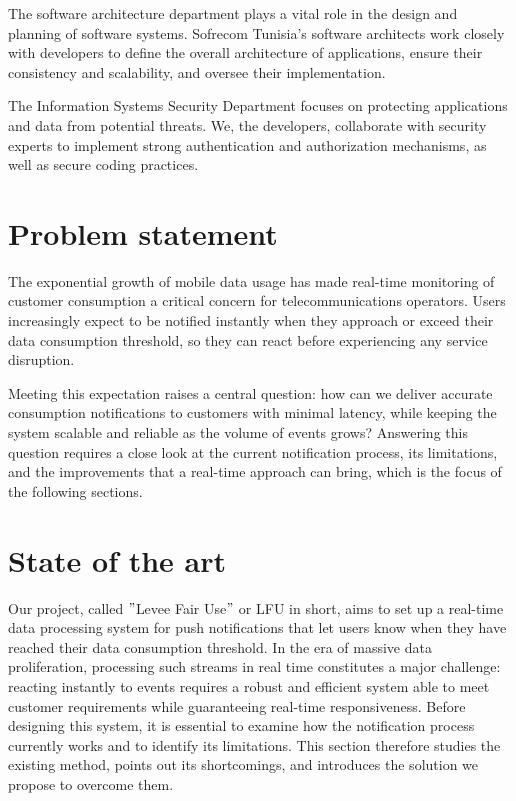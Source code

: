 The software architecture department plays a vital role in the design and planning of software systems.
Sofrecom Tunisia's software architects work closely with developers to define the overall architecture of applications, ensure their consistency and scalability, and oversee their implementation.

The Information Systems Security Department focuses on protecting applications and data from potential threats.
We, the developers, collaborate with security experts to implement strong authentication and authorization mechanisms, as well as secure coding practices.

\section{Problem statement}
The exponential growth of mobile data usage has made real-time monitoring of customer consumption a critical concern for telecommunications operators.
Users increasingly expect to be notified instantly when they approach or exceed their data consumption threshold, so they can react before experiencing any service disruption.

Meeting this expectation raises a central question: how can we deliver accurate consumption notifications to customers with minimal latency, while keeping the system scalable and reliable as the volume of events grows?
Answering this question requires a close look at the current notification process, its limitations, and the improvements that a real-time approach can bring, which is the focus of the following sections.

\section{State of the art}

Our project, called \("\)Levee Fair Use\("\) or LFU in short, aims to set up a real-time data processing system for push notifications that let users know when they have reached their data consumption threshold.
In the era of massive data proliferation, processing such streams in real time constitutes a major challenge: reacting instantly to events requires a robust and efficient system able to meet customer requirements while guaranteeing real-time responsiveness.
Before designing this system, it is essential to examine how the notification process currently works and to identify its limitations.
This section therefore studies the existing method, points out its shortcomings, and introduces the solution we propose to overcome them.

